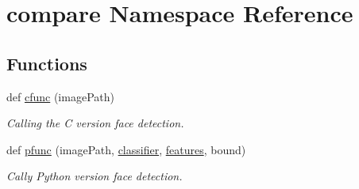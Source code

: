 \hypertarget{namespacecompare}{}\section{compare Namespace Reference}
\label{namespacecompare}
\subsection*{Functions}
\begin{DoxyCompactItemize}
\item 
def \hyperlink{namespacecompare_aa0c59464d2339c77a1d07202f854b8da}{cfunc} (image\+Path)
\begin{DoxyCompactList}\small\item\em Calling the C version face detection. \end{DoxyCompactList}\item 
def \hyperlink{namespacecompare_ab0b90ece2676a4ed2b6a0b9c0a586cfb}{pfunc} (image\+Path, \hyperlink{namespacecompare_a2e7fcdc543e6a0fde614081764c7b5f8}{classifier}, \hyperlink{namespacecompare_a54c639c8b89bbd55f7362ec8285739bc}{features}, bound)
\begin{DoxyCompactList}\small\item\em Cally Python version face detection. \end{DoxyCompactList}\end{DoxyCompactItemize}
